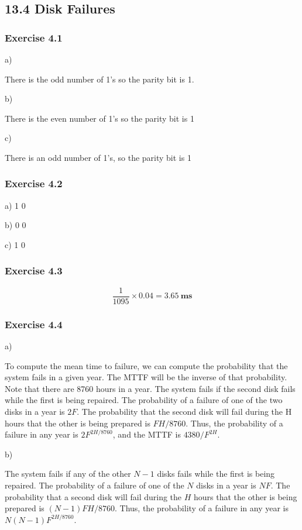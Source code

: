 \documentclass[../../main.tex]{subfiles}
\begin{document}
\subsection{13.4 Disk Failures}

\subsubsection*{Exercise 4.1}

a)

There is the odd number of 1's so the parity bit is 1.

b)

There is the even number of 1's so the parity bit is 1

c)

There is an odd number of 1's, so the parity bit is 1

\subsubsection*{Exercise 4.2}

a) 1 0

b) 0 0

c) 1 0

\subsubsection*{Exercise 4.3}

$$
\frac{1}{1095} \times 0.04 = 3.65 \ \mathbf{ms}
$$

\subsubsection*{Exercise 4.4}

a)

To compute the mean time to failure, we can compute the probability that the system fails in a given year. The MTTF will be the
inverse of that probability. Note that there are 8760 hours in a year. The system fails if the second disk fails while the first
is being repaired. The probability of a failure of one of the two disks in a year is $2F$.
The probability that the second disk will fail during the H hours that the other is being prepared is
$FH/ 8760$. Thus, the probability of a failure in any year is $2F^{2H/8760}$, and the MTTF is
$4380 / F^{2H}$.

b)

The system fails if any of the other $N-1$ disks fails while the first is being repaired.
The probability of a failure of one of the $N$ disks in a year is $NF$. The probability
that a second disk will fail during the $H$ hours that the other is being prepared
is $(N - 1)FH / 8760$. Thus, the probability of a failure in any year is $N(N-1)F^{2H/8760}$.
\end{document}
